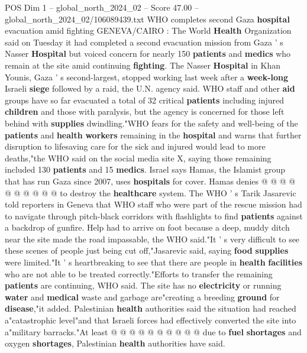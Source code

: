 \begin{textsample}{POS Dim 1 – global\_north\_2024\_02 – Score 47.00 – global\_north\_2024\_02/106089439.txt}  \label{ex:f1_pos_093}
WHO completes second Gaza \textbf{hospital} evacuation amid fighting GENEVA/CAIRO : The World \textbf{Health} Organization said on Tuesday it had completed a second evacuation mission from Gaza ' s Nasser \textbf{Hospital} but voiced concern for nearly 150 \textbf{patients} and \textbf{medics} who remain at the site amid continuing \textbf{fighting}.
The Nasser \textbf{Hospital} in Khan Younis, Gaza ' s second-largest, stopped working last week after a \textbf{week-long} Israeli \textbf{siege} followed by a raid, the U.N. agency said.
WHO staff and other \textbf{aid} groups have so far evacuated a total of 32 critical \textbf{patients} including injured \textbf{children} and those with paralysis, but the agency is concerned for those left behind with \textbf{supplies} dwindling."WHO fears for the safety and well-being of the \textbf{patients} and \textbf{health} \textbf{workers} remaining in the \textbf{hospital} and warns that further disruption to lifesaving care for the sick and injured would lead to more deaths,"the WHO said on the social media site X, saying those remaining included 130 \textbf{patients} and 15 \textbf{medics}.
Israel says Hamas, the Islamist group that has run Gaza since 2007, uses \textbf{hospitals} for cover.
Hamas denies @ @ @ @ @ @ @ @ @ @ to destroy the \textbf{healthcare} system.
The WHO ' s Tarik Jasarevic told reporters in Geneva that WHO staff who were part of the rescue mission had to navigate through pitch-black corridors with flashlights to find \textbf{patients} against a backdrop of gunfire.
Help had to arrive on foot because a deep, muddy ditch near the site made the road impassable, the WHO said."It ' s very difficult to see these scenes of people just being cut off,"Jasarevic said, saying \textbf{food} \textbf{supplies} were limited."It ' s heartbreaking to see that there are people in \textbf{health} \textbf{facilities} who are not able to be treated correctly."Efforts to transfer the remaining \textbf{patients} are continuing, WHO said.
The site has no \textbf{electricity} or running \textbf{water} and \textbf{medical} waste and garbage are"creating a breeding \textbf{ground} for \textbf{disease},"it added.
Palestinian \textbf{health} authorities said the situation had reached a"catastrophic level"and that Israeli forces had effectively converted the site into a"military barracks."At least @ @ @ @ @ @ @ @ @ @ due to \textbf{fuel} \textbf{shortages} and oxygen \textbf{shortages}, Palestinian \textbf{health} authorities have said.

\end{textsample}
